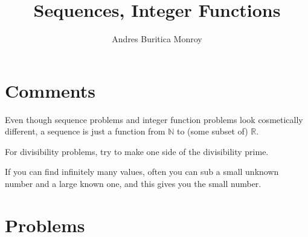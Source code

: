 \documentclass{article}
\title{Sequences, Integer Functions}
\author{Andres Buritica Monroy}
\date{}
\newcommand\Nn{\mathbb{N}}
\newcommand\Rr{\mathbb{R}}
\begin{document}
\maketitle
\section{Comments}
Even though sequence problems and integer function problems look cosmetically
different, a sequence is just a function from $\Nn$ to (some subset of) $\Rr$.

For divisibility problems, try to make one side of the divisibility prime.

If you can find infinitely many values, often you can sub a small unknown number
and a large known one, and this gives you the small number.
\section{Problems}
\end{document}
